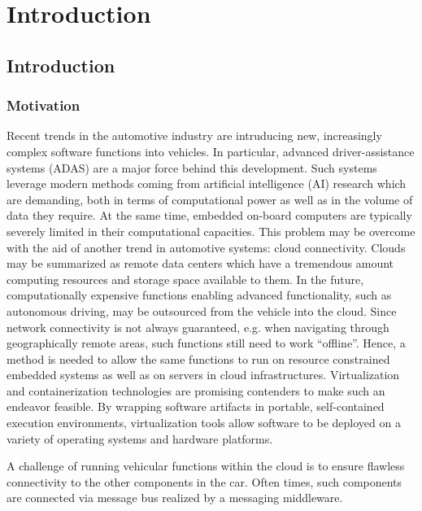 
\chapter{Introduction}\label{chapter:introduction}



\section{Introduction} 
\label{introduction}

\subsection{Motivation}
Recent trends in the automotive industry are intruducing new, increasingly complex software functions into vehicles. In particular, advanced driver-assistance systems (ADAS) are a major force behind this development. Such systems leverage modern methods coming from artificial intelligence (AI) research which are demanding, both in terms of computational power as well as in the volume of data they require. At the same time, embedded on-board computers are typically severely limited in their computational capacities. This problem may be overcome with the aid of another trend in automotive systems: cloud connectivity. Clouds may be summarized as remote data centers which have a tremendous amount computing resources and storage space available to them. In the future, computationally expensive functions enabling advanced functionality, such as autonomous driving, may be outsourced from the vehicle into the cloud. Since network connectivity is not always guaranteed, e.g. when navigating through geographically remote areas, such functions still need to work ``offline''. Hence, a method is needed to allow the same functions to run on resource constrained embedded systems as well as on servers in cloud infrastructures. Virtualization and containerization technologies are promising contenders to make such an endeavor feasible. By wrapping software artifacts in portable, self-contained execution environments, virtualization tools allow software to be deployed on a variety of operating systems and hardware platforms.

A challenge of running vehicular functions within the cloud is to ensure flawless connectivity to the other components in the car. Often times, such components are connected via message bus realized by a messaging middleware.

%
%
%
%
%
%
%
%
%
%

